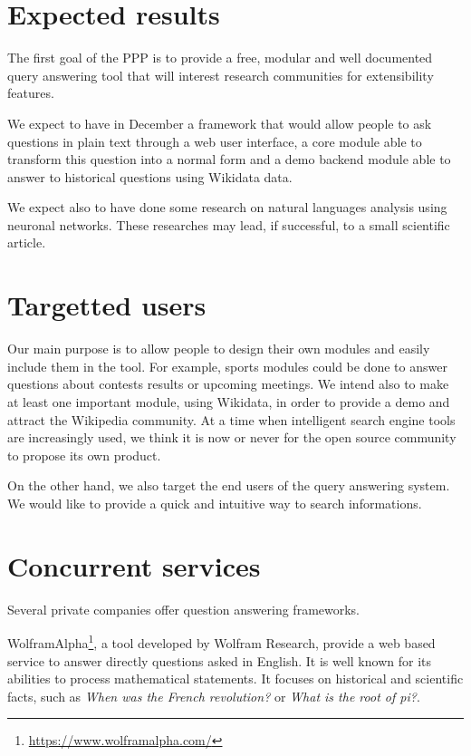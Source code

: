 \documentclass[a4paper,10pt]{article}
\begin{document}
\section{Expected results}
The first goal of the PPP is to provide a free, modular and well documented
query answering tool that will interest research communities for extensibility features. 

We expect to have in December a framework that would allow people to ask
questions in plain text through a web user interface, a core module able to transform
this question into a normal form and a demo backend module able to answer
to historical questions using Wikidata data.

We expect also to have done some research on natural languages analysis using
neuronal networks. These researches may lead, if successful, to
a small scientific article.

\section{Targetted users}

Our main purpose is to allow people to design their own modules and
easily include them in the tool. For example, sports modules could be done to 
answer questions about contests results or 
upcoming meetings.  We intend also to make at least one important module, using 
Wikidata, in order to provide a demo and attract the Wikipedia community. 
At a time when intelligent search engine tools are increasingly used, we think it 
is now or never for the open source community to propose its own product.

On the other hand, we also target the end users of the query answering system. We
would like to provide a quick and intuitive way to search informations.

\section{Concurrent services}

Several private companies offer question answering frameworks. 

WolframAlpha\footnote{\url{https://www.wolframalpha.com/}}, a tool developed by 
Wolfram Research, provide a web based service to answer directly questions asked
in English. It is well known for its abilities to process mathematical statements.
It focuses on historical and scientific facts, such as \emph{When was the French 
revolution?} or \emph{What is the root of pi?}.
\end{document}
